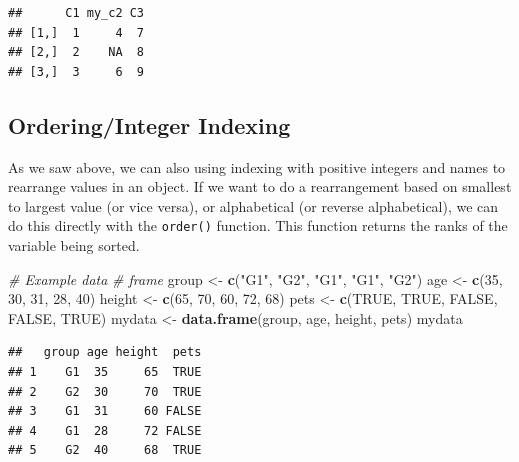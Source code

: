 \documentclass[
]{book}
\newenvironment{Shaded}{\begin{snugshade}}{\end{snugshade}}
\newcommand{\CommentTok}[1]{\textcolor[rgb]{0.56,0.35,0.01}{\textit{#1}}}
\newcommand{\DecValTok}[1]{\textcolor[rgb]{0.00,0.00,0.81}{#1}}
\newcommand{\KeywordTok}[1]{\textcolor[rgb]{0.13,0.29,0.53}{\textbf{#1}}}
\newcommand{\NormalTok}[1]{#1}
\newcommand{\OperatorTok}[1]{\textcolor[rgb]{0.81,0.36,0.00}{\textbf{#1}}}
\newcommand{\OtherTok}[1]{\textcolor[rgb]{0.56,0.35,0.01}{#1}}
\newcommand{\StringTok}[1]{\textcolor[rgb]{0.31,0.60,0.02}{#1}}
\begin{document}
\begin{verbatim}
##      C1 my_c2 C3
## [1,]  1     4  7
## [2,]  2    NA  8
## [3,]  3     6  9
\end{verbatim}

\hypertarget{orderinginteger-indexing}{%
\subsection{Ordering/Integer Indexing}\label{orderinginteger-indexing}}

As we saw above, we can also using indexing with positive integers and names to rearrange values in an object. If we want to do a rearrangement based on smallest to largest value (or vice versa), or alphabetical (or reverse alphabetical), we can do this directly with the \texttt{order()} function. This function returns the ranks of the variable being sorted.

\begin{Shaded}
\begin{Highlighting}[]
\CommentTok{# Example data}
\CommentTok{# frame}
\NormalTok{group <-}\StringTok{ }\KeywordTok{c}\NormalTok{(}\StringTok{"G1"}\NormalTok{, }\StringTok{"G2"}\NormalTok{,}
    \StringTok{"G1"}\NormalTok{, }\StringTok{"G1"}\NormalTok{, }\StringTok{"G2"}\NormalTok{)}
\NormalTok{age <-}\StringTok{ }\KeywordTok{c}\NormalTok{(}\DecValTok{35}\NormalTok{, }\DecValTok{30}\NormalTok{, }\DecValTok{31}\NormalTok{,}
    \DecValTok{28}\NormalTok{, }\DecValTok{40}\NormalTok{)}
\NormalTok{height <-}\StringTok{ }\KeywordTok{c}\NormalTok{(}\DecValTok{65}\NormalTok{, }\DecValTok{70}\NormalTok{, }\DecValTok{60}\NormalTok{,}
    \DecValTok{72}\NormalTok{, }\DecValTok{68}\NormalTok{)}
\NormalTok{pets <-}\StringTok{ }\KeywordTok{c}\NormalTok{(}\OtherTok{TRUE}\NormalTok{, }\OtherTok{TRUE}\NormalTok{,}
    \OtherTok{FALSE}\NormalTok{, }\OtherTok{FALSE}\NormalTok{, }\OtherTok{TRUE}\NormalTok{)}
\NormalTok{mydata <-}\StringTok{ }\KeywordTok{data.frame}\NormalTok{(group,}
\NormalTok{    age, height, pets)}
\NormalTok{mydata}
\end{Highlighting}
\end{Shaded}

\begin{verbatim}
##   group age height  pets
## 1    G1  35     65  TRUE
## 2    G2  30     70  TRUE
## 3    G1  31     60 FALSE
## 4    G1  28     72 FALSE
## 5    G2  40     68  TRUE
\end{verbatim}

\begin{Shaded}
\end{Shaded}
\end{document}
